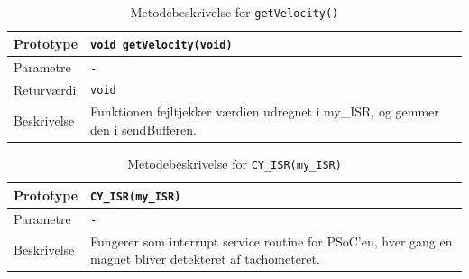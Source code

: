 \begin{table}[h]
\begin{tabularx}{\textwidth}{| L{2.5 cm} | Z |} \hline
Prototype 	& \texttt{void getVelocity(void)} \\\hline
Parametre 	& \texttt{-}		\\\hline
Returværdi	& \texttt{void} 			\newline \\\hline
Beskrivelse	& Funktionen fejltjekker værdien udregnet i my\_ISR, og gemmer den i sendBufferen. \newline \\\hline
\end{tabularx}
\caption{Metodebeskrivelse for \texttt{getVelocity()}}
\label{table:psoc_getvelocity}
\end{table}

\begin{table}[h]
\begin{tabularx}{\textwidth}{| L{2.5 cm} | Z |} \hline
Prototype 	& \texttt{CY\_ISR(my\_ISR)} 	\\\hline
Parametre 	& \texttt{-}				\\\hline
Beskrivelse	& Fungerer som interrupt service routine for PSoC'en, hver gang en magnet bliver detekteret af tachometeret.\newline \\\hline
\end{tabularx}
\caption{Metodebeskrivelse for \texttt{CY\_ISR(my\_ISR)}}
\label{table:psoc_my_isr}
\end{table}

\clearpage
